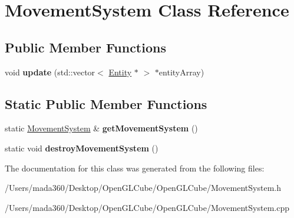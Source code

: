 \hypertarget{class_movement_system}{}\section{Movement\+System Class Reference}
\label{class_movement_system}
\subsection*{Public Member Functions}
\begin{DoxyCompactItemize}
\item 
\hypertarget{class_movement_system_a0795197be538c631332c888824ab1bee}{}void {\bfseries update} (std\+::vector$<$ \hyperlink{class_entity}{Entity} $\ast$ $>$ $\ast$entity\+Array)\label{class_movement_system_a0795197be538c631332c888824ab1bee}

\end{DoxyCompactItemize}
\subsection*{Static Public Member Functions}
\begin{DoxyCompactItemize}
\item 
\hypertarget{class_movement_system_a9c24da715496fbe082e1302091a8cf2c}{}static \hyperlink{class_movement_system}{Movement\+System} \& {\bfseries get\+Movement\+System} ()\label{class_movement_system_a9c24da715496fbe082e1302091a8cf2c}

\item 
\hypertarget{class_movement_system_a24947d2de2835b087cabad3dce7d431c}{}static void {\bfseries destroy\+Movement\+System} ()\label{class_movement_system_a24947d2de2835b087cabad3dce7d431c}

\end{DoxyCompactItemize}


The documentation for this class was generated from the following files\+:\begin{DoxyCompactItemize}
\item 
/\+Users/mada360/\+Desktop/\+Open\+G\+L\+Cube/\+Open\+G\+L\+Cube/Movement\+System.\+h\item 
/\+Users/mada360/\+Desktop/\+Open\+G\+L\+Cube/\+Open\+G\+L\+Cube/Movement\+System.\+cpp\end{DoxyCompactItemize}
